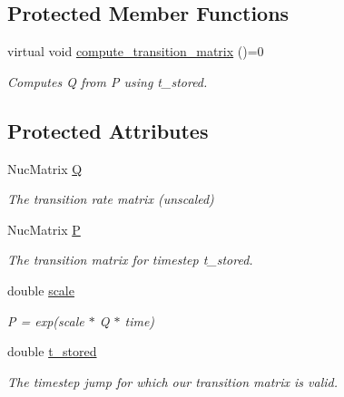 \subsection*{Protected Member Functions}
\begin{DoxyCompactItemize}
\item 
virtual void \hyperlink{classretrocombinator_1_1PointMutationModel_a29357db0a7cfb35ab1540840aa4cfda1}{compute\+\_\+transition\+\_\+matrix} ()=0
\begin{DoxyCompactList}\small\item\em Computes Q from P using t\+\_\+stored. \end{DoxyCompactList}\end{DoxyCompactItemize}
\subsection*{Protected Attributes}
\begin{DoxyCompactItemize}
\item 
\mbox{\label{classretrocombinator_1_1PointMutationModel_a3f52ae4a94cb8a8cf75113f8b4a7a570}} 
Nuc\+Matrix \hyperlink{classretrocombinator_1_1PointMutationModel_a3f52ae4a94cb8a8cf75113f8b4a7a570}{Q}
\begin{DoxyCompactList}\small\item\em The transition rate matrix (unscaled) \end{DoxyCompactList}\item 
\mbox{\label{classretrocombinator_1_1PointMutationModel_a3717e58e2be7cbfebffea2081dcf9663}} 
Nuc\+Matrix \hyperlink{classretrocombinator_1_1PointMutationModel_a3717e58e2be7cbfebffea2081dcf9663}{P}
\begin{DoxyCompactList}\small\item\em The transition matrix for timestep {\itshape t\+\_\+stored}. \end{DoxyCompactList}\item 
\mbox{\label{classretrocombinator_1_1PointMutationModel_a3258dfbdae0f2614cdc66f13ae028b46}} 
double \hyperlink{classretrocombinator_1_1PointMutationModel_a3258dfbdae0f2614cdc66f13ae028b46}{scale}
\begin{DoxyCompactList}\small\item\em P = exp(scale $\ast$ Q $\ast$ time) \end{DoxyCompactList}\item 
\mbox{\label{classretrocombinator_1_1PointMutationModel_a677f67cf3336af8aa105e60ee991bd13}} 
double \hyperlink{classretrocombinator_1_1PointMutationModel_a677f67cf3336af8aa105e60ee991bd13}{t\+\_\+stored}
\begin{DoxyCompactList}\small\item\em The timestep jump for which our transition matrix is valid. \end{DoxyCompactList}\end{DoxyCompactItemize}


